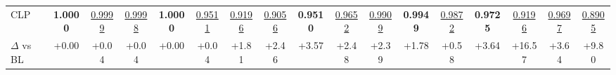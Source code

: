 \begin{tabular}{lcccccccccccccccc}
CLP & \cellcolor{cyan!25}\textbf{1.0000} & \cellcolor{orange!25}\underline{0.9999} & \cellcolor{orange!25}\underline{0.9998} & \cellcolor{cyan!25}\textbf{1.0000} & \cellcolor{orange!25}\underline{0.9511} & \cellcolor{orange!25}\underline{0.9196} & \cellcolor{orange!25}\underline{0.9056} & \cellcolor{cyan!25}\textbf{0.9510} & \cellcolor{orange!25}\underline{0.9652} & \cellcolor{orange!25}\underline{0.9909} & \cellcolor{cyan!25}\textbf{0.9949} & \cellcolor{orange!25}\underline{0.9872} & \cellcolor{cyan!25}\textbf{0.9725} & \cellcolor{orange!25}\underline{0.9196} & \cellcolor{orange!25}\underline{0.9697} & \cellcolor{orange!25}\underline{0.8905} \\
\hspace*{1em}$\Delta$ vs BL & \textcolor{green!60!black}{+0.00} & \textcolor{green!60!black}{+0.04} & \textcolor{green!60!black}{+0.04} & \textcolor{green!60!black}{+0.00} & \textcolor{green!60!black}{+0.04} & \textcolor{green!60!black}{+1.81} & \textcolor{green!60!black}{+2.46} & \textcolor{green!60!black}{+3.57} & \textcolor{green!60!black}{+2.48} & \textcolor{green!60!black}{+2.39} & \textcolor{green!60!black}{+1.78} & \textcolor{green!60!black}{+0.58} & \textcolor{green!60!black}{+3.64} & \textcolor{green!60!black}{+16.57} & \textcolor{green!60!black}{+3.64} & \textcolor{green!60!black}{+9.80} \\
\bottomrule
\end{tabular}
